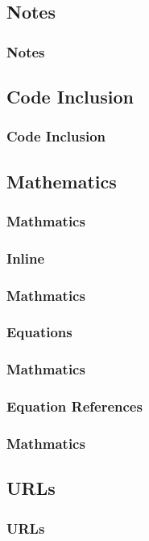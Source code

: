 {\subsection{Notes}
\begin{frame}[fragile]
  \frametitle{Notes}
  \vspace{3mm}
  
\end{frame}

\subsection{Code Inclusion}
\begin{frame}[fragile]
  \frametitle{Code Inclusion}
  \vspace{3mm}
  
\end{frame}

\subsection{Mathematics}
\begin{frame}[fragile]
  \frametitle{Mathmatics}
  \vspace{3mm}
  
\end{frame}

\subsubsection{Inline}
\begin{frame}[fragile]
  \frametitle{Mathmatics }
  \vspace{3mm}
  
\end{frame}

\subsubsection{Equations}
\begin{frame}[fragile]
  \frametitle{Mathmatics }
  \vspace{3mm}
  
\end{frame}

\subsubsection{Equation References}
\begin{frame}[fragile]
  \frametitle{Mathmatics }
  \vspace{3mm}
  
\end{frame}

\subsection{URLs}
\begin{frame}[fragile]
  \frametitle{URLs}
  \vspace{3mm}
  
\end{frame}

}

